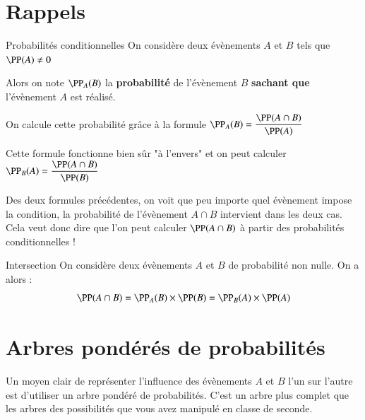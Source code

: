 \documentclass[oneside,12pt]{article}          %
\begin{document}
\section{Rappels}

\begin{rappel}{Probabilités conditionnelles}
	On considère deux évènements $A$ et $B$ tels que $\PP(A) \neq 0$
	
	Alors on note $\PP_A(B)$ la \textbf{probabilité} de l'évènement $B$ \textbf{sachant que} l'évènement $A$ est réalisé.
	
	On calcule cette probabilité grâce à la formule $\PP_A(B) = \dfrac{\PP(A \cap B)}{\PP(A)}$
\end{rappel}

\begin{remarque}
	Cette formule fonctionne bien sûr "à l'envers" et on peut calculer $\PP_B(A) = \dfrac{\PP(A \cap B)}{\PP(B)}$
\end{remarque}



Des deux formules précédentes, on voit que peu importe quel évènement impose la condition, la probabilité de l'évènement $A \cap B$ intervient dans les deux cas. Cela veut donc dire que l'on peut calculer $\PP(A \cap B)$ à partir des probabilités conditionnelles !

\begin{propriete}{Intersection}
	On considère deux évènements $A$ et $B$ de probabilité non nulle. On a alors :
	\[ \PP(A \cap B) = \PP_A(B) \times \PP(B) = \PP_B(A) \times \PP(A) \]
\end{propriete}



\section{Arbres pondérés de probabilités}

Un moyen clair de représenter l'influence des évènements $A$ et $B$ l'un sur l'autre est d'utiliser un arbre pondéré de probabilités. C'est un arbre plus complet que les arbres des possibilités que vous avez manipulé en classe de seconde.
\end{document}
